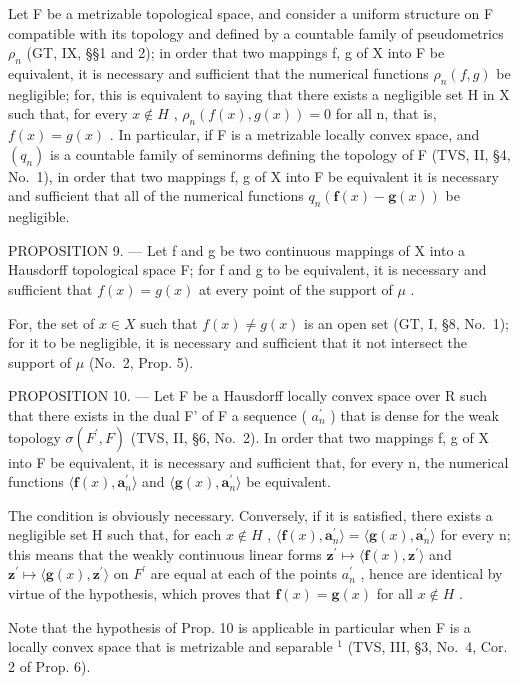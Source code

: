 Let F be a metrizable topological space, and consider a uniform structure on F compatible with its topology and defined by a countable family of pseudometrics \(\rho_{n}\) (GT, IX, §§1 and 2); in order that two mappings f, g of X into F be equivalent, it is necessary and sufficient that the numerical functions \(\rho_{n}(f,g)\) be negligible; for, this is equivalent to saying that there exists a negligible set H in X such that, for every \(x\notin H\) , \(\rho_{n}(f(x),g(x))=0\) for all n, that is, \(f(x)=g(x)\) . In particular, if F is a metrizable locally convex space, and \((q_{n})\) is a countable family of seminorms defining the topology of F (TVS, II, §4, No.~1), in order that two mappings f, g of X into F be equivalent it is necessary and sufficient that all of the numerical functions \(q_{n}(\mathbf{f}(x)-\mathbf{g}(x))\) be negligible.

PROPOSITION 9. --- Let f and g be two continuous mappings of X into a Hausdorff topological space F; for f and g to be equivalent, it is necessary and sufficient that \(f(x) = g(x)\) at every point of the support of \(\mu\) .

For, the set of \(x \in X\) such that \(f(x) \neq g(x)\) is an open set (GT, I, §8, No.~1); for it to be negligible, it is necessary and sufficient that it not intersect the support of \(\mu\) (No.~2, Prop. 5).

PROPOSITION 10. --- Let F be a Hausdorff locally convex space over R such that there exists in the dual F' of F a sequence ( \(a_{n}^{\prime}\) ) that is dense for the weak topology \(\sigma(F^{\prime},F)\) (TVS, II, §6, No.~2). In order that two mappings f, g of X into F be equivalent, it is necessary and sufficient that, for every n, the numerical functions \(\langle\mathbf{f}(x),\mathbf{a}_{n}^{\prime}\rangle\) and \(\langle\mathbf{g}(x),\mathbf{a}_{n}^{\prime}\rangle\) be equivalent.

The condition is obviously necessary. Conversely, if it is satisfied, there exists a negligible set H such that, for each \(x \notin H\) , \(\langle \mathbf{f}(x), \mathbf{a}_{n}^{\prime} \rangle = \langle \mathbf{g}(x), \mathbf{a}_{n}^{\prime} \rangle\) for every n; this means that the weakly continuous linear forms \(\mathbf{z}^{\prime} \mapsto \langle \mathbf{f}(x), \mathbf{z}^{\prime} \rangle\) and \(\mathbf{z}^{\prime} \mapsto \langle \mathbf{g}(x), \mathbf{z}^{\prime} \rangle\) on \(F^{\prime}\) are equal at each of the points \(a_{n}^{\prime}\) , hence are identical by virtue of the hypothesis, which proves that \(\mathbf{f}(x) = \mathbf{g}(x)\) for all \(x \notin H\) .

Note that the hypothesis of Prop. 10 is applicable in particular when F is a locally convex space that is metrizable and separable \(^{1}\) (TVS, III, §3, No.~4, Cor. 2 of Prop. 6).

